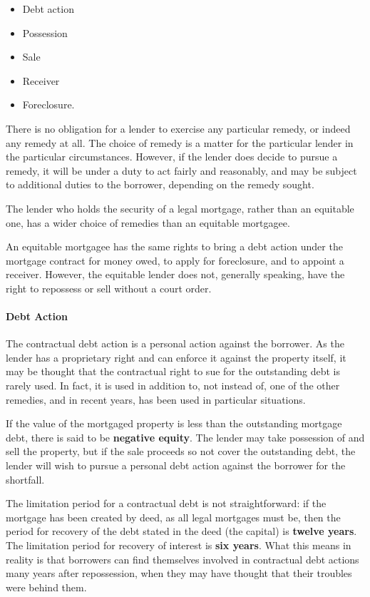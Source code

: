 \documentclass[
]{article}
\providecommand{\tightlist}{%
  \setlength{\itemsep}{0pt}\setlength{\parskip}{0pt}}
\begin{document}
\begin{itemize}
\tightlist
\item
  Debt action
\item
  Possession
\item
  Sale
\item
  Receiver
\item
  Foreclosure.
\end{itemize}

There is no obligation for a lender to exercise any particular remedy,
or indeed any remedy at all. The choice of remedy is a matter for the
particular lender in the particular circumstances. However, if the
lender does decide to pursue a remedy, it will be under a duty to act
fairly and reasonably, and may be subject to additional duties to the
borrower, depending on the remedy sought.

The lender who holds the security of a legal mortgage, rather than an
equitable one, has a wider choice of remedies than an equitable
mortgagee.

An equitable mortgagee has the same rights to bring a debt action under
the mortgage contract for money owed, to apply for foreclosure, and to
appoint a receiver. However, the equitable lender does not, generally
speaking, have the right to repossess or sell without a court order.

\hypertarget{debt-action}{%
\paragraph{Debt Action}\label{debt-action}}

The contractual debt action is a personal action against the borrower.
As the lender has a proprietary right and can enforce it against the
property itself, it may be thought that the contractual right to sue for
the outstanding debt is rarely used. In fact, it is used in addition to,
not instead of, one of the other remedies, and in recent years, has been
used in particular situations.

If the value of the mortgaged property is less than the outstanding
mortgage debt, there is said to be \textbf{negative equity}. The lender
may take possession of and sell the property, but if the sale proceeds
so not cover the outstanding debt, the lender will wish to pursue a
personal debt action against the borrower for the shortfall.

The limitation period for a contractual debt is not straightforward: if
the mortgage has been created by deed, as all legal mortgages must be,
then the period for recovery of the debt stated in the deed (the
capital) is \textbf{twelve years}. The limitation period for recovery of
interest is \textbf{six years}. What this means in reality is that
borrowers can find themselves involved in contractual debt actions many
years after repossession, when they may have thought that their troubles
were behind them.
\end{document}
